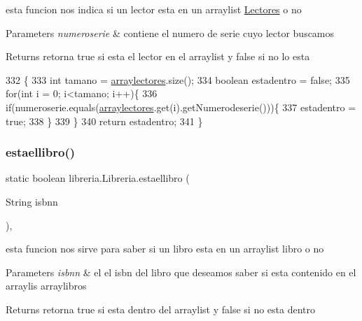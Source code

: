 esta funcion nos indica si un lector esta en un arraylist \mbox{\hyperlink{classlibreria_1_1_lectores}{Lectores}} o no 
\begin{DoxyParams}{Parameters}
{\em numeroserie} & contiene el numero de serie cuyo lector buscamos \\
\hline
\end{DoxyParams}
\begin{DoxyReturn}{Returns}
retorna true si esta el lector en el arraylist y false si no lo esta 
\end{DoxyReturn}

\begin{DoxyCode}
332                                                            \{
333          \textcolor{keywordtype}{int} tamano = \mbox{\hyperlink{classlibreria_1_1_libreria_ac9e002dcb370eb6caa314d18cf14a293}{arraylectores}}.size();
334          \textcolor{keywordtype}{boolean} estadentro = \textcolor{keyword}{false};
335          \textcolor{keywordflow}{for}(\textcolor{keywordtype}{int} i = 0; i<tamano; i++)\{
336              \textcolor{keywordflow}{if}(numeroserie.equals(\mbox{\hyperlink{classlibreria_1_1_libreria_ac9e002dcb370eb6caa314d18cf14a293}{arraylectores}}.get(i).getNumerodeserie()))\{
337                  estadentro = \textcolor{keyword}{true};
338              \}
339          \}
340          \textcolor{keywordflow}{return} estadentro;
341      \}
\end{DoxyCode}
\mbox{\label{classlibreria_1_1_libreria_a0af77d7fa2b6f3c0a0b218ee9df08ce3}} 
\subsubsection{\texorpdfstring{estaellibro()}{estaellibro()}}
{\footnotesize\ttfamily static boolean libreria.\+Libreria.\+estaellibro (\begin{DoxyParamCaption}\item[{String}]{isbnn }\end{DoxyParamCaption})\hspace{0.3cm}{\ttfamily [inline]}, {\ttfamily [static]}}

esta funcion nos sirve para saber si un libro esta en un arraylist libro o no 
\begin{DoxyParams}{Parameters}
{\em isbnn} & el el isbn del libro que deseamos saber si esta contenido en el arraylis arraylibros \\
\hline
\end{DoxyParams}
\begin{DoxyReturn}{Returns}
retorna true si esta dentro del arraylist y false si no esta dentro 
\end{DoxyReturn}

